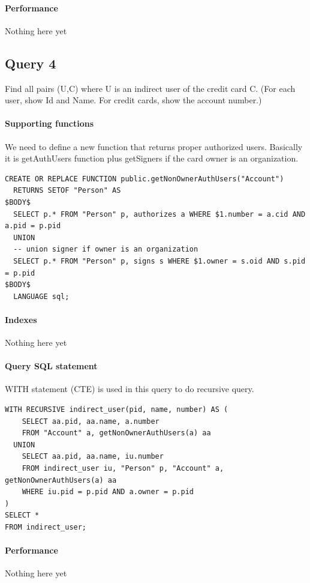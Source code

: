 \documentclass[11pt]{article}
\begin{document}
\paragraph{Performance} Nothing here yet

\subsection{Query 4}
Find all pairs (U,C) where U is an indirect user of the credit card C. (For each user, show Id and Name. For credit cards, show the account number.)

\paragraph{Supporting functions} We need to define a new function that returns proper authorized users. Basically it is getAuthUsers function plus getSigners if the card owner is an organization.
\begin{verbatim}
CREATE OR REPLACE FUNCTION public.getNonOwnerAuthUsers("Account")
  RETURNS SETOF "Person" AS
$BODY$
  SELECT p.* FROM "Person" p, authorizes a WHERE $1.number = a.cid AND a.pid = p.pid
  UNION
  -- union signer if owner is an organization
  SELECT p.* FROM "Person" p, signs s WHERE $1.owner = s.oid AND s.pid = p.pid
$BODY$
  LANGUAGE sql;
\end{verbatim}

\paragraph{Indexes} Nothing here yet

\paragraph{Query SQL statement} WITH statement (CTE) is used in this query to do recursive query.
\begin{verbatim}
WITH RECURSIVE indirect_user(pid, name, number) AS (
    SELECT aa.pid, aa.name, a.number
    FROM "Account" a, getNonOwnerAuthUsers(a) aa
  UNION
    SELECT aa.pid, aa.name, iu.number
    FROM indirect_user iu, "Person" p, "Account" a, getNonOwnerAuthUsers(a) aa
    WHERE iu.pid = p.pid AND a.owner = p.pid
)
SELECT *
FROM indirect_user;
\end{verbatim}

\paragraph{Performance} Nothing here yet
\end{document}
